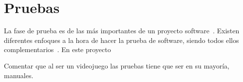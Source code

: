 

\section{Pruebas}

La fase de prueba es de las más importantes de un proyecto software~\cite{art}. Existen diferentes enfoques a la hora de hacer la prueba de software, siendo todos ellos complementarios~\cite{beizer_software_1990}. En este proyecto 

Comentar que al ser un videojuego las pruebas tiene que ser en su mayoría, manuales.
